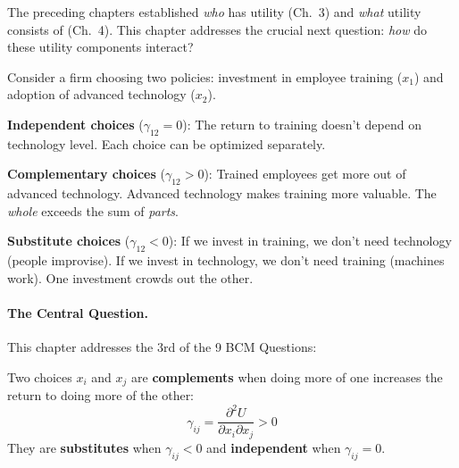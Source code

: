 The preceding chapters established \emph{who} has utility (Ch.~3) and \emph{what}
utility consists of (Ch.~4). This chapter addresses the crucial next question:
\emph{how} do these utility components interact?

\begin{intuition}
Consider a firm choosing two policies: investment in employee training ($x_1$)
and adoption of advanced technology ($x_2$).

\textbf{Independent choices} ($\gamma_{12} = 0$):
The return to training doesn't depend on technology level.
Each choice can be optimized separately.

\textbf{Complementary choices} ($\gamma_{12} > 0$):
Trained employees get more out of advanced technology.
Advanced technology makes training more valuable.
The \emph{whole} exceeds the sum of \emph{parts}.

\textbf{Substitute choices} ($\gamma_{12} < 0$):
If we invest in training, we don't need technology (people improvise).
If we invest in technology, we don't need training (machines work).
One investment crowds out the other.
\end{intuition}

\paragraph{The Central Question.}
This chapter addresses the 3rd of the 9 BCM Questions:

\begin{center}
\end{center}

\begin{definition}[Complementarity]
Two choices $x_i$ and $x_j$ are \textbf{complements} when doing more of one
increases the return to doing more of the other:
\begin{equation}
\gamma_{ij} = \frac{\partial^2 U}{\partial x_i \partial x_j} > 0
\label{eq:complementarity-def}
\end{equation}
They are \textbf{substitutes} when $\gamma_{ij} < 0$ and \textbf{independent}
when $\gamma_{ij} = 0$.
\end{definition}

